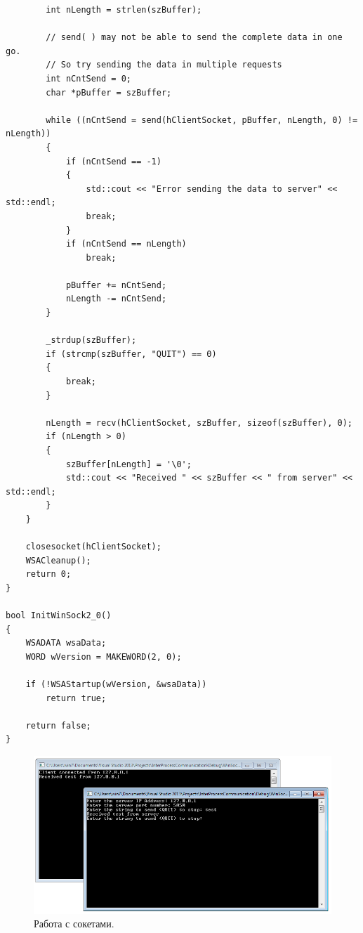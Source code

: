 \documentclass[a4paper,12pt]{article} %
\begin{document}
\begin{verbatim}
        int nLength = strlen(szBuffer);

        // send( ) may not be able to send the complete data in one go.
        // So try sending the data in multiple requests
        int nCntSend = 0;
        char *pBuffer = szBuffer;

        while ((nCntSend = send(hClientSocket, pBuffer, nLength, 0) != nLength))
        {
            if (nCntSend == -1)
            {
                std::cout << "Error sending the data to server" << std::endl;
                break;
            }
            if (nCntSend == nLength)
                break;

            pBuffer += nCntSend;
            nLength -= nCntSend;
        }

        _strdup(szBuffer);
        if (strcmp(szBuffer, "QUIT") == 0)
        {
            break;
        }

        nLength = recv(hClientSocket, szBuffer, sizeof(szBuffer), 0);
        if (nLength > 0)
        {
            szBuffer[nLength] = '\0';
            std::cout << "Received " << szBuffer << " from server" << std::endl;
        }
    }

    closesocket(hClientSocket);
    WSACleanup();
    return 0;
}

bool InitWinSock2_0()
{
    WSADATA wsaData;
    WORD wVersion = MAKEWORD(2, 0);

    if (!WSAStartup(wVersion, &wsaData))
        return true;

    return false;
}
\end{verbatim}

\begin{figure}[h!]
\centering
\includegraphics[scale=0.8]{img/06_Winsock}
\caption{Работа с сокетами.}
\end{figure}

\newpage
\end{document}
